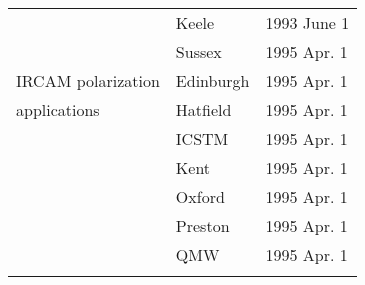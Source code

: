 \begin{table}
\begin{center}
\begin{tabular}{|p{36mm}|p{50mm}|p{30mm}|}
                        & Keele            & 1993 June 1 \\
                        & Sussex           & 1995 Apr. 1 \\
IRCAM polarization      & Edinburgh        & 1995 Apr. 1 \\
applications            & Hatfield         & 1995 Apr. 1 \\
                        & ICSTM            & 1995 Apr. 1 \\
                        & Kent             & 1995 Apr. 1 \\
                        & Oxford           & 1995 Apr. 1 \\
                        & Preston          & 1995 Apr. 1 \\
                        & QMW              & 1995 Apr. 1 \\
& & \\ \hline
\end{tabular}
\end{center}
\end{table}

